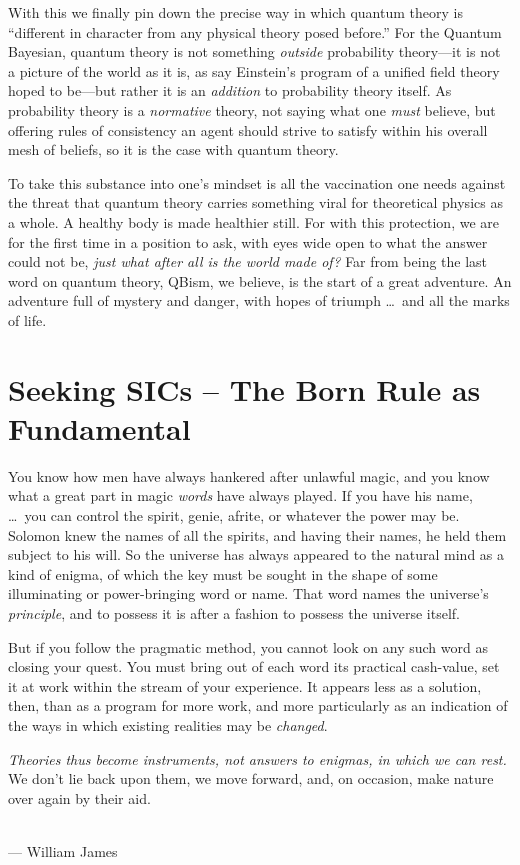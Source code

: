 With this we finally pin down the precise way in which quantum theory is ``different in character from any physical theory posed before.''
For the Quantum Bayesian, quantum theory is not something {\it outside\/} probability theory---it is not a picture of the world as it is, as say Einstein's program of a unified field theory hoped to be---but rather it is an {\it addition\/} to probability theory itself.  As probability theory is a {\it normative\/} theory, not saying what one {\it must\/} believe, but offering rules of consistency an agent should strive to satisfy within his overall mesh of beliefs, so it is the case with quantum theory.

To take this substance into one's mindset is all the vac\-ci\-nation one needs against the threat that quantum theory carries something viral for theoretical physics as a whole.  A healthy body is made healthier still.  For with this pro\-tection, we are for the first time in a position to ask, with eyes wide open to what the answer could not be, {\it just what after all is the world made of?}  Far from being the last word on quantum theory, QBism, we believe, is the start of a great adventure.  An adventure full of mystery and danger, with hopes of triumph \ldots\ and all the marks of life.

\section{Seeking SICs -- The Born Rule as Fundamental}

\label{SeekingSICs}

\begin{flushright}
\baselineskip=13pt
\parbox{2.8in}{\baselineskip=13pt\footnotesize

You know how men have always hankered after unlawful magic, and you know
what a great part in magic {\it words\/} have always played. If you
have his name, \ldots\ you can
control the spirit, genie, afrite, or whatever the power may be.
Solomon knew the names of all the spirits, and having their names, he
held them subject to his will.  So the universe has always appeared
to the natural mind as a kind of enigma, of which the key must be
sought in the shape of some illuminating or power-bringing word or
name.  That word names the universe's {\it principle}, and to possess
it is after a fashion to possess the universe itself.\medskip

But if you follow the pragmatic method, you cannot look on any such
word as closing your quest.  You must bring out of each word its
practical cash-value, set it at work within the stream of your
experience.  It appears less as a solution, then, than as a program
for more work, and more particularly as an indication of the ways in
which existing realities may be {\it changed}.\medskip

{\it Theories thus become instruments, not answers to enigmas, in
which we can rest.}  We don't lie back upon them, we move forward,
and, on occasion, make nature over again by their aid.}
\medskip\\
\small --- William James
\end{flushright}


